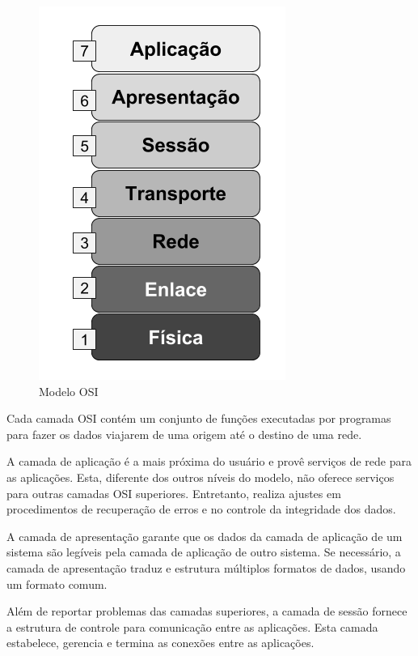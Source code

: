 \documentclass[
12pt,				%
openright,			%
oneside,			%
a4paper,			%
brazil,				%
]{abntex2}
\begin{document}
	\begin{figure} [H]
		\centering
		\includegraphics[scale=.5]{figuras/cap2/01ModeloOSI}
		\caption{\label{fig_1}Modelo OSI}
	\end{figure}
		
	\par Cada camada OSI contém um conjunto de funções executadas por programas para fazer os dados viajarem de uma origem até o destino de uma rede.
	
	\par A camada de aplicação é a mais próxima do usuário e provê serviços de rede para as aplicações. Esta, diferente dos outros níveis do modelo, não oferece serviços para outras camadas OSI superiores. Entretanto, realiza ajustes em procedimentos de recuperação de erros e no controle da integridade dos dados.
	
	\par A camada de apresentação garante que os dados da camada de aplicação de um sistema são legíveis pela camada de aplicação de outro sistema. Se necessário, a camada de apresentação traduz e estrutura múltiplos formatos de dados, usando um formato comum.
	
	\par Além de reportar problemas das camadas superiores, a camada de sessão fornece a estrutura de controle para comunicação entre as aplicações. Esta camada estabelece, gerencia e termina as conexões entre as aplicações.
	
\end{document}
